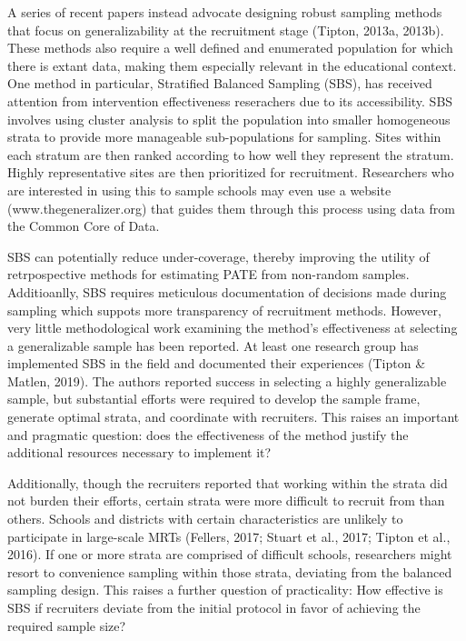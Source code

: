 \documentclass[man,floatsintext]{apa6}
\begin{document}
A series of recent papers instead advocate designing robust sampling methods that focus on generalizability at the recruitment stage (Tipton, 2013a, 2013b). These methods also require a well defined and enumerated population for which there is extant data, making them especially relevant in the educational context. One method in particular, Stratified Balanced Sampling (SBS), has received attention from intervention effectiveness reserachers due to its accessibility. SBS involves using cluster analysis to split the population into smaller homogeneous strata to provide more manageable sub-populations for sampling. Sites within each stratum are then ranked according to how well they represent the stratum. Highly representative sites are then prioritized for recruitment. Researchers who are interested in using this to sample schools may even use a website (www.thegeneralizer.org) that guides them through this process using data from the Common Core of Data.

SBS can potentially reduce under-coverage, thereby improving the utility of retrpospective methods for estimating PATE from non-random samples. Additioanlly, SBS requires meticulous documentation of decisions made during sampling which suppots more transparency of recruitment methods. However, very little methodological work examining the method's effectiveness at selecting a generalizable sample has been reported. At least one research group has implemented SBS in the field and documented their experiences (Tipton \& Matlen, 2019). The authors reported success in selecting a highly generalizable sample, but substantial efforts were required to develop the sample frame, generate optimal strata, and coordinate with recruiters. This raises an important and pragmatic question: does the effectiveness of the method justify the additional resources necessary to implement it?

Additionally, though the recruiters reported that working within the strata did not burden their efforts, certain strata were more difficult to recruit from than others. Schools and districts with certain characteristics are unlikely to participate in large-scale MRTs (Fellers, 2017; Stuart et al., 2017; Tipton et al., 2016). If one or more strata are comprised of difficult schools, researchers might resort to convenience sampling within those strata, deviating from the balanced sampling design. This raises a further question of practicality: How effective is SBS if recruiters deviate from the initial protocol in favor of achieving the required sample size?
\end{document}
